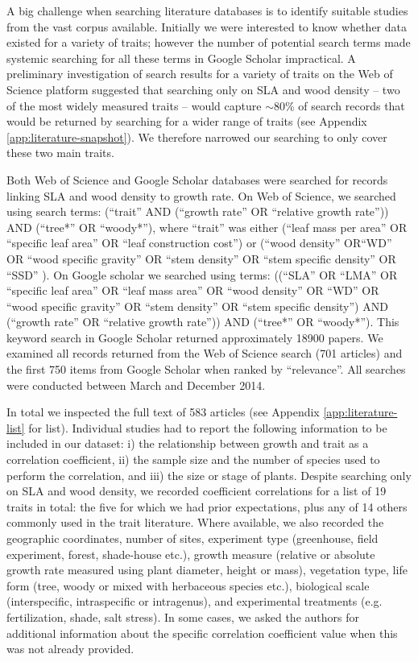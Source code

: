 \documentclass[a4paper,11pt]{article}
\begin{document}
A big challenge when searching literature databases is to identify suitable studies from the vast corpus available. Initially we were interested to know whether data existed for a variety of traits; however the number of potential search terms made systemic searching for all these terms in Google Scholar impractical. A preliminary investigation of search results for a variety of traits on the Web of Science platform suggested that searching only on SLA and wood density -- two of the most widely measured traits -- would capture $\sim$80\% of search records that would be returned by searching for a wider range of traits (see Appendix \ref{app:literature-snapshot}). We therefore narrowed our searching to only cover these two main traits.

Both Web of Science and Google Scholar databases were searched for records linking SLA and wood density to growth rate. On Web of Science, we searched using  search terms: (``trait'' AND (``growth rate'' OR ``relative growth rate'')) AND (``tree*'' OR ``woody*''), where ``trait'' was either (``leaf mass per area'' OR ``specific leaf area'' OR ``leaf construction cost'') or (``wood density'' OR``WD'' OR ``wood specific gravity'' OR ``stem density'' OR ``stem specific density'' OR ``SSD'' ). On Google scholar we searched using terms: ((``SLA'' OR ``LMA'' OR ``specific leaf area'' OR ``leaf mass area'' OR ``wood density'' OR ``WD'' OR ``wood specific gravity'' OR ``stem density'' OR ``stem specific density'') AND (``growth rate'' OR ``relative growth rate'')) AND (``tree*'' OR ``woody*''). This keyword search in Google Scholar returned approximately 18900 papers. We examined all records returned from the Web of Science search (701 articles) and the first 750 items from Google Scholar when ranked by ``relevance''. All searches were conducted between March and December 2014.

In total we inspected the full text of 583 articles (see Appendix \ref{app:literature-list} for list). Individual studies had to report the following information to be included in our dataset: i) the relationship between growth and trait as a correlation coefficient, ii) the sample size and the number of species used to perform the correlation, and iii) the size or stage of plants. Despite searching only on SLA and wood density, we recorded coefficient correlations for a list of 19 traits in total: the five for which we had prior expectations, plus any of 14 others commonly used in the trait literature. Where available, we also recorded the geographic coordinates, number of sites, experiment type (greenhouse, field experiment, forest, shade-house etc.), growth measure (relative or absolute growth rate measured using plant diameter, height or mass), vegetation type, life form (tree, woody or mixed with herbaceous species etc.), biological scale (interspecific, intraspecific or intragenus), and experimental treatments (e.g. fertilization, shade, salt stress). In some cases, we asked the authors for additional information about the specific correlation coefficient value when this was not already provided.
\end{document}
